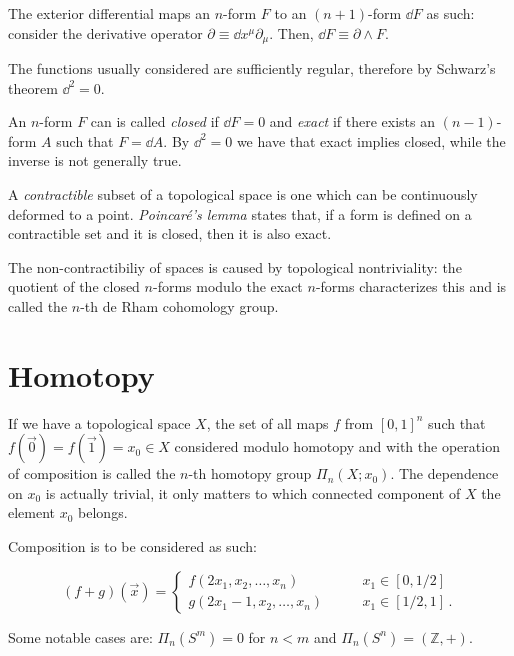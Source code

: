 \documentclass[main.tex]{subfiles}
\begin{document}
The exterior differential maps an \(n\)-form \(F\) to an \((n+1)\)-form \(\dd{F}\) as such:
consider the derivative operator \(\partial \equiv \dd{x^{\mu}} \partial _\mu\).
Then, \(\dd{F} \equiv \partial \wedge F\).

The functions usually considered are sufficiently regular, therefore by Schwarz's theorem \(\dd^2 = 0\).

An \(n\)-form \(F\) can is called \emph{closed} if \(\dd{F}= 0 \) and \emph{exact} if there exists an \((n-1)\)-form \(A\) such that \(F = \dd{A}\).
By \(\dd^2=0\) we have that exact implies closed, while the inverse is not generally true.

A \emph{contractible} subset of a topological space is one which can be continuously deformed to a point.
\emph{Poincaré's lemma} states that, if a form is defined on a contractible set and it is closed, then it is also exact.

The non-contractibiliy of spaces is caused by topological nontriviality: the quotient of the closed \(n\)-forms modulo the exact \(n\)-forms characterizes this and is called the \(n\)-th de Rham cohomology group. 

\section{Homotopy} \label{sec:homotopy}

If we have a topological space \(X\), the set of all maps \(f\) from \([0,1]^n\) such that  \(f(\vec{0}) = f(\vec{1} )=x_0 \in X\) considered modulo homotopy and with the operation of composition is called the \(n\)-th homotopy group \(\Pi_n (X; x_0)\). The dependence on \(x_0\) is actually trivial, it only matters to which connected component of \(X\) the element \(x_0\) belongs.

Composition is to be considered as such:

\begin{equation}
  (f+g) (\vec{x} ) = \begin{cases}
  f(2x_1, x_2, \dots, x_n) \qquad & x_1 \in [0, 1/2 ] \\
  g(2x_1-1, x_2, \dots, x_n) \qquad & x_1 \in [1/2, 1] \,.
  \end{cases}
\end{equation}

Some notable cases are: \(\Pi_n (S^m) = 0 \) for \(n<m\) and \(\Pi_n (S^n) = (\mathbb Z, +)\).
\end{document}
